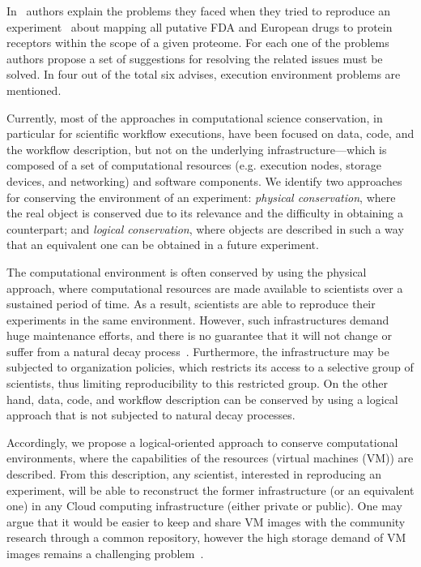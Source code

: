 In~\cite{Garijo2013} authors explain the problems they faced when they tried to reproduce an experiment~\cite{drugomePrimer} about mapping all putative FDA and European drugs to protein receptors within the scope of a given proteome. For each one of the problems authors propose a set of suggestions for resolving the related issues must be solved. In four out of the total six advises, execution environment problems are mentioned.

Currently, most of the approaches in computational science conservation, in particular for scientific workflow executions, have been focused on data, code, and the workflow description, but not on the underlying infrastructure---which is composed of a set of computational resources (e.g. execution nodes, storage devices, and networking) and software components. We identify two approaches for conserving the environment of an experiment: \emph{physical conservation}, where the real object is conserved due to its relevance and the difficulty in obtaining a counterpart; and \emph{logical conservation}, where objects are described in such a way that an equivalent one can be obtained in a future experiment.

The computational environment is often conserved by using the physical approach, where computational resources are made available to scientists over a sustained period of time. As a result, scientists are able to reproduce their experiments in the same environment. However, such infrastructures demand huge maintenance efforts, and there is no guarantee that it will not change or suffer from a natural decay process~\cite{Gavish2011637}. Furthermore, the infrastructure may be subjected to organization policies, which restricts its access to a selective group of scientists, thus limiting reproducibility to this restricted group. On the other hand, data, code, and workflow description can be conserved by using a logical approach that is not subjected to natural decay processes. 

Accordingly, we propose a logical-oriented approach to conserve computational environments, where the capabilities of the resources (virtual machines (VM)) are described. From this description, any scientist, interested in reproducing an experiment, will be able to reconstruct the former infrastructure (or an equivalent one) in any Cloud computing infrastructure (either private or public). One may argue that it would be easier to keep and share VM images with the community research through a common repository, however the high storage demand of VM images remains a challenging problem~\cite{Mao:2014:ROD:2600090.2512348,6552826}. 

